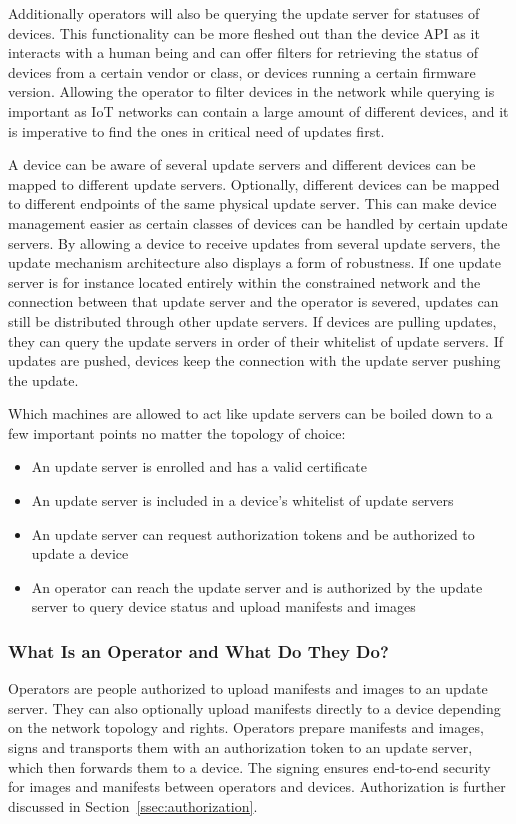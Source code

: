 \documentclass[0-thesis.tex]{subfiles}
\begin{document}
Additionally operators will also be querying the update server for statuses of devices.
This functionality can be more fleshed out than the device API as it interacts with a
human being and can offer filters for retrieving the status of devices from a certain
vendor or class, or devices running a certain firmware version. Allowing the operator to
filter devices in the network while querying is important as IoT networks can contain a
large amount of different devices, and it is imperative to find the ones in critical need
of updates first.

A device can be aware of several update servers and different devices can be mapped to
different update servers. Optionally, different devices can be mapped to different
endpoints of the same physical update server. This can make device management easier as
certain classes of devices can be handled by certain update servers. By allowing a device
to receive updates from several update servers, the update mechanism architecture also
displays a form of robustness. If one update server is for instance located entirely
within the constrained network and the connection between that update server and the
operator is severed, updates can still be distributed through other update servers. If
devices are pulling updates, they can query the update servers in order of their whitelist
of update servers. If updates are pushed, devices keep the connection with the update
server pushing the update.

Which machines are allowed to act like update servers can be boiled down to a few
important points no matter the topology of choice:

\begin{itemize}
    \item An update server is enrolled and has a valid certificate
    \item An update server is included in a device's whitelist of update servers
    \item An update server can request authorization tokens and be authorized to update a
            device
    \item An operator can reach the update server and is authorized by the update server
            to query device status and upload manifests and images
\end{itemize}

\subsubsection{What Is an Operator and What Do They Do?}
\label{sssec:what-is-an-operator}
Operators are people authorized to upload manifests and images to an update server. They
can also optionally upload manifests directly to a device depending on the network
topology and rights. Operators prepare manifests and images, signs and transports them
with an authorization token to an update server, which then forwards them to a device. The
signing ensures end-to-end security for images and manifests between operators and
devices. Authorization is further discussed in Section~\ref{ssec:authorization}.
\end{document}
